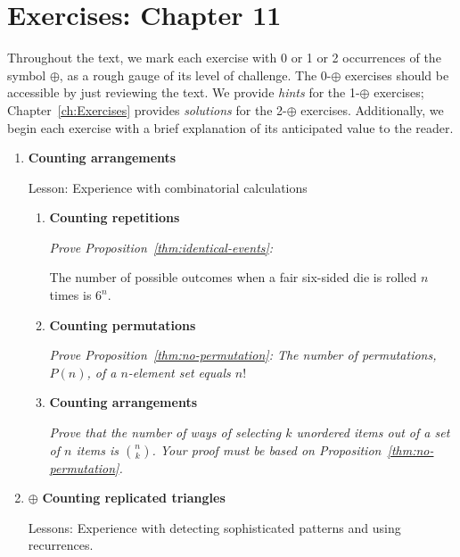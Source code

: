 \section{Exercises: Chapter 11}

Throughout the text, we mark each exercise with 0 or 1 or 2 occurrences of the symbol $\oplus$, as a rough gauge of its level of challenge.  The 0-$\oplus$ exercises should be accessible by just reviewing the text.  We provide {\em hints} for the 1-$\oplus$ exercises; Chapter~\ref{ch:Exercises} provides {\em solutions} for the 2-$\oplus$ exercises.  Additionally, we begin each exercise with a brief explanation of its anticipated value to the reader.

\begin{enumerate}
\item
{\bf Counting arrangements}

{\sc Lesson:} Experience with combinatorial calculations

  \begin{enumerate}
  \item
{\bf Counting repetitions}

\smallskip

{\em Prove Proposition~\ref{thm:identical-events}:

The number of possible outcomes when a fair six-sided die is rolled $n$ times is $6^n$.}

  \medskip\item
{\bf Counting permutations}

\smallskip

{\em Prove Proposition~\ref{thm:no-permutation}:
The number of permutations, $P(n)$, of a $n$-element set equals $n!$}

  \medskip\item
{\bf Counting arrangements}

\smallskip

{\em Prove that the number of ways of selecting $k$ unordered items out of a set of $n$ items is $\displaystyle {n \choose k}$.  Your proof must be based on Proposition~\ref{thm:no-permutation}.}
  \end{enumerate}

\medskip\item
$\oplus$
{\bf Counting replicated triangles}

{\sc Lessons:} Experience with detecting sophisticated patterns and using recurrences.

\smallskip


\end{enumerate}
